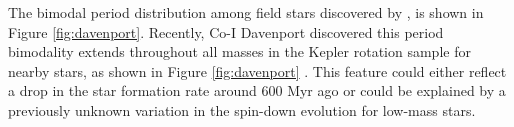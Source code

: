 \documentclass[useAMS, usenatbib, preprint, 12pt]{aastex}
\newcommand{\eg}{{\it e.g.}}
\begin{document}
The bimodal period distribution among field stars discovered by
\citet{mcquillan2013}, is shown in Figure \ref{fig:davenport}.
Recently, Co-I Davenport discovered this period bimodality extends throughout
all masses in the Kepler rotation sample for nearby stars, as shown in Figure
\ref{fig:davenport} \citep{davenport2017}.
This feature could either reflect a drop in the star formation rate around 600
Myr ago or could be explained by a previously unknown variation in the
spin-down evolution for low-mass stars.
\end{document}
